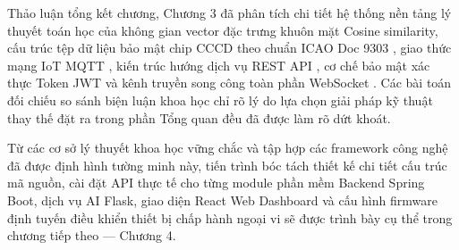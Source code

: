 \documentclass[../DoAn.tex]{subfiles}
\begin{document}
Thảo luận tổng kết chương, Chương 3 đã phân tích chi tiết hệ thống nền tảng lý thuyết toán học của không gian vector đặc trưng khuôn mặt Cosine similarity, cấu trúc tệp dữ liệu bảo mật chip CCCD theo chuẩn ICAO Doc 9303 \cite{icao9303}, giao thức mạng IoT MQTT \cite{mqtt5}, kiến trúc hướng dịch vụ REST API \cite{fielding2000}, cơ chế bảo mật xác thực Token JWT \cite{rfc7519} và kênh truyền song công toàn phần WebSocket \cite{rfc6455}. Các bài toán đối chiếu so sánh biện luận khoa học chỉ rõ lý do lựa chọn giải pháp kỹ thuật thay thế đặt ra trong phần Tổng quan đều đã được làm rõ dứt khoát. 

Từ các cơ sở lý thuyết khoa học vững chắc và tập hợp các framework công nghệ đã được định hình tường minh này, tiến trình bóc tách thiết kế chi tiết cấu trúc mã nguồn, cài đặt API thực tế cho từng module phần mềm Backend Spring Boot, dịch vụ AI Flask, giao diện React Web Dashboard và cấu hình firmware định tuyến điều khiển thiết bị chấp hành ngoại vi sẽ được trình bày cụ thể trong chương tiếp theo — Chương 4.
\end{document}
